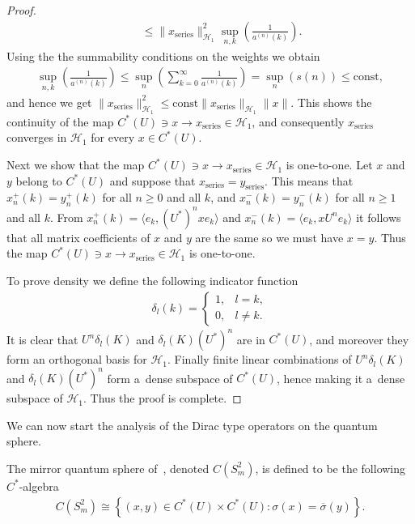 \documentclass[pdftex]{sigma}
\numberwithin{equation}{section}
\begin{document}
\begin{proof}
\begin{gather*}
\qquad
\le \|x_{\textrm{series}}\|^2_{\mathcal{H}_1}\sup_{n,k}\left(\frac{1}{a^{(n)}(k)}\right).
\end{gather*}
Using the the summability conditions on the weights we obtain
\begin{gather*}
\sup_{n,k}\left(\frac{1}{a^{(n)}(k)}\right) \le \sup_{n}\left(\sum\limits_{k=0}^\infty \frac{1}{a^{(n)}(k)}\right)=
\sup_{n} (s(n)) \le \textrm{const},
\end{gather*}
and hence we get $\|x_{\textrm{series}}\|_{\mathcal{H}_1}^2 \le
\textrm{const}\|x_{\textrm{series}}\|_{\mathcal{H}_1}\|x\|$.
This shows the continuity of the map $C^*(U)\ni x\to x_\textrm{series}\in \mathcal{H}_1$, and consequently
$x_\textrm{series}$ converges in $\mathcal{H}_1$ for every $x\in C^*(U)$.

Next we show that the map $C^*(U)\ni x\to x_\textrm{series}\in \mathcal{H}_1$ is one-to-one.
Let $x$ and $y$ belong to $C^*(U)$ and suppose that $x_\textrm{series} = y_\textrm{series}$.
This means that $x_n^+(k) = y_n^+(k)$ for all $n\ge0$ and all $k$, and $x_n^-(k) = y_n^-(k)$ for all $n\ge1$ and all
$k$.
From $x_n^+(k) = \langle e_k, (U^*)^nx e_k\rangle$ and $x_n^-(k) = \langle e_k, xU^n e_k\rangle$ it follows that all
matrix coef\/f\/icients of $x$ and $y$ are the same so we must have $x=y$.
Thus the map $C^*(U)\ni x\to x_\textrm{series}\in \mathcal{H}_1$ is one-to-one.

To prove density we def\/ine the following indicator function
\begin{gather*}
\delta_l(k) =
\begin{cases}
1, & l=k,
\\
0, & l\neq k.
\end{cases}
\end{gather*}
It is clear that $U^n\delta_l(K)$ and $\delta_l(K)(U^*)^n$ are in $C^*(U)$, and moreover they form an orthogonal basis
for $\mathcal{H}_1$.
Finally f\/inite linear combinations of $U^n\delta_l(K)$ and $\delta_l(K)(U^*)^n$ form a~dense subspace of $C^*(U)$, hence
making it a~dense subspace of $\mathcal{H}_1$.
Thus the proof is complete.
\end{proof}

We can now start the analysis of the Dirac type operators on the quantum sphere.

\begin{defin}
The mirror quantum sphere of~\cite{HMS}, denoted $C(S_{m}^2)$, is def\/ined to be the following $C^*$-algebra
\begin{gather*}
C(S_{m}^2) \cong \left\{(x,y)\in C^*(U)\times C^*(U): \sigma(x) = \overline{\sigma}(y)\right\}.
\end{gather*}
\end{defin}
\end{document}
